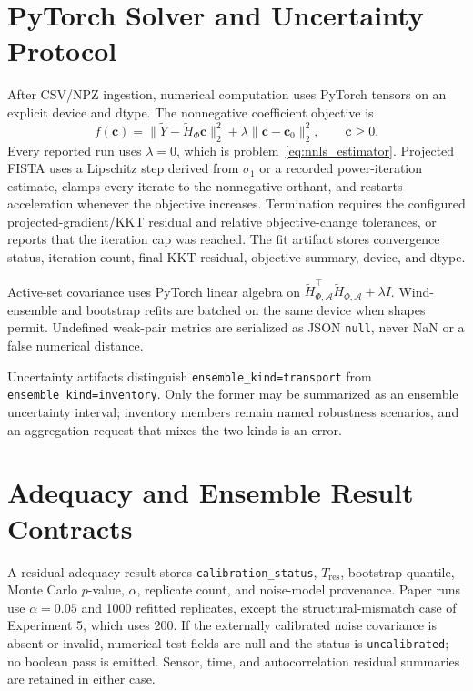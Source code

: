 \section{PyTorch Solver and Uncertainty Protocol}
\label{app:pytorch_solver}

After CSV/NPZ ingestion, numerical computation uses PyTorch tensors on an
explicit device and dtype.  The nonnegative coefficient objective is
\begin{equation}
f(\mathbf c)=
\|\widetilde Y-\widetilde H_\Phi\mathbf c\|_2^2
+\lambda\|\mathbf c-\mathbf c_0\|_2^2,
\qquad \mathbf c\ge0.
\label{eq:appendix_fista_objective}
\end{equation}
Every reported run uses \(\lambda=0\), which is problem~\eqref{eq:nnls_estimator}.
Projected FISTA uses a Lipschitz step derived from \(\sigma_1\) or a recorded
power-iteration estimate, clamps every iterate to the nonnegative orthant, and
restarts acceleration whenever the objective increases.  Termination requires
the configured projected-gradient/KKT residual and relative objective-change
tolerances, or reports that the iteration cap was reached.  The fit artifact
stores convergence status, iteration count, final KKT residual, objective
summary, device, and dtype.

Active-set covariance uses PyTorch linear algebra on
\(\widetilde H_{\Phi,\mathcal A}^{\top}
\widetilde H_{\Phi,\mathcal A}+\lambda I\).  Wind-ensemble and bootstrap refits
are batched on the same device when shapes permit.  Undefined weak-pair metrics
are serialized as JSON \texttt{null}, never NaN or a false numerical distance.

Uncertainty artifacts distinguish \texttt{ensemble\_kind=transport} from
\texttt{ensemble\_kind=inventory}.  Only the former may be summarized as an
ensemble uncertainty interval; inventory members remain named robustness
scenarios, and an aggregation request that mixes the two kinds is an error.

\section{Adequacy and Ensemble Result Contracts}
\label{app:adequacy_contracts}

A residual-adequacy result stores \texttt{calibration\_status},
\(T_{\mathrm{res}}\), bootstrap quantile, Monte Carlo \(p\)-value,
\(\alpha\), replicate count, and noise-model provenance.  Paper runs use
\(\alpha=0.05\) and 1000 refitted replicates, except the structural-mismatch case of
Experiment 5, which uses 200.  If the externally calibrated
noise covariance is absent or invalid, numerical test fields are null and the
status is \texttt{uncalibrated}; no boolean pass is emitted.  Sensor, time, and
autocorrelation residual summaries are retained in either case.

